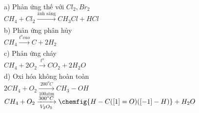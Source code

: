 \documentclass[a4paper]{article}
\newcommand\tab[1][1cm]{\hspace*{#1}}
\begin{document}
a) Phản ứng thế với $Cl_{2}, Br_{2}$\\
\tab $CH_{4} + Cl_{2} \xrightarrow[\text{}]{\text{ánh sáng}} CH_{3}Cl + HCl$\\
b) Phản ứng phân hủy \\
\tab $CH_{4} \xrightarrow[\text{}]{\text{$t^{o} cao$}} C + 2H_{2}$\\
c) Phản ứng cháy\\
\tab $CH_{4} + 2O_{2} \xrightarrow[\text{}]{\text{$t^{o}$}} CO_{2} + 2H_{2}O$\\
d) Oxi hóa không hoàn toàn \\
\tab $2CH_{4} + O_{2} \xrightarrow[\text{100atm}]{\text{$200^{o}C$}} CH_{3}-OH$\\
\tab $CH_{4} + O_{2} \xrightarrow[\text{$V_{2}O_{5}$}]{\text{$300^{o}C$}} \chemfig{H-C([1]=O)([-1]-H)} + H_{2}O$\\
\end{document}
